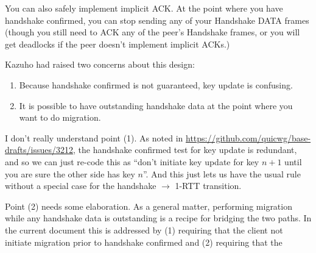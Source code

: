 \documentclass{article}
\begin{document}
You can also safely implement implicit ACK. At the point
where you have handshake confirmed, you can stop sending
any of your Handshake DATA frames (though you still
need to ACK any of the peer's Handshake frames, or you
will get deadlocks if the peer doesn't implement implicit
ACKs.)

Kazuho had raised two concerns about this design:

\begin{enumerate}
\item Because handshake confirmed is not guaranteed, key update
  is confusing.
\item It is possible to have outstanding handshake data at the
  point where you want to do migration.
\end{enumerate}

I don't really understand point (1). As noted in
\url{https://github.com/quicwg/base-drafts/issues/3212}, the handshake
confirmed test for key update is redundant, and so we can just re-code
this as ``don't initiate key update for key $n+1$ until you are sure
the other side has key $n$''. And this just lets us have the usual
rule without a special case for the handshake $\rightarrow$ 1-RTT
transition.

Point (2) needs some elaboration. As a general matter, performing
migration while any handshake data is outstanding is a recipe for
bridging the two paths. In the current document this is addressed by
(1) requiring that the client not initiate migration prior to handshake
confirmed and (2) requiring that the 
\end{document}
